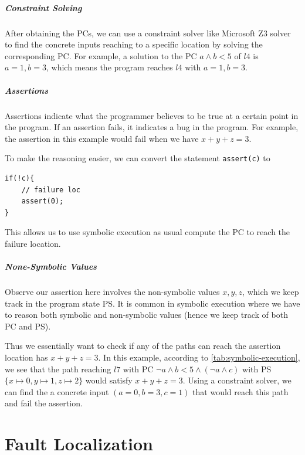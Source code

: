 \documentclass[oneside,11pt,dvipsnames]{book}
\newcommand{\code}[1]{\texttt{#1}}
\begin{document}
\paragraph{Constraint Solving} 
After obtaining the PCs, we can use a constraint solver like Microsoft Z3 solver to find the concrete inputs reaching to a specific location by solving the corresponding PC. For example, a solution to the PC $a \land b < 5$ of $l4$ is $a=1, b=3$, which means the program reaches $l4$ with $a=1, b=3$.

\paragraph{Assertions} Assertions indicate what the programmer believes to be true at a certain point in the program. If an assertion fails, it indicates a bug in the program. For example, the assertion in this example would fail when we have $x + y + z = 3$.

To make the reasoning easier, we can convert the statement \code{assert(c)} to 
\begin{lstlisting}
if(!c){
    // failure loc
    assert(0);
}
\end{lstlisting}

This allows us to use symbolic execution as usual compute the PC to reach the failure location. 

\paragraph{None-Symbolic Values} Observe our assertion here involves the non-symbolic values $x, y, z$, which we keep track in the program state PS. It is common in symbolic execution where we have to reason both symbolic and non-symbolic values (hence we keep track of both PC and PS).

Thus we essentially want to check if any of the paths can reach the assertion location has $x + y + z = 3$. In this example, according to \autoref{tab:symbolic-execution}, we see that the path reaching $l7$ with PC $\lnot a \land b < 5 \land (\lnot a \land c)$ with PS $\{x\mapsto 0, y \mapsto 1, z \mapsto2\}$ would satisfy $x + y + z = 3$. Using a constraint solver, we can find the a concrete input $(a=0, b=3, c = 1)$ that would reach this path and fail the assertion.





\chapter{Fault Localization}\label{chapter:debugging}
\end{document}
